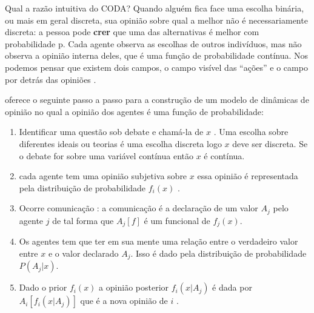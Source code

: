 Qual a razão intuitiva do CODA?  Quando alguém fica face uma escolha
binária, ou mais em geral discreta, sua opinião sobre qual a melhor
não é necessariamente discreta: a pessoa pode \textbf{crer} que uma
das alternativas é melhor com probabilidade p. Cada agente observa as
escolhas de outros indivíduos, mas não observa a opinião interna
deles, que é uma função de probabilidade contínua. Nos podemos pensar
que existem dois campos, o campo visível das ``ações'' e o campo por
detrás das opiniões \cite{martins2008continuous}.

  oferece o seguinte passo a passo
para a construção de um modelo de dinâmicas de opinião no qual a opinião dos
agentes é uma função de probabilidade:

\begin{enumerate}
\item Identificar uma questão sob debate e chamá-la de $x$ . Uma
  escolha sobre diferentes ideais ou teorias é uma escolha discreta
  logo $x$ deve ser discreta. Se o debate for sobre uma variável
  contínua então $x$ é contínua.
\item cada agente tem uma opinião subjetiva sobre $x$ essa opinião é
  representada pela distribuição de probabilidade $f_i(x)$ .
\item Ocorre comunicação : a comunicação é a declaração de um valor
  $ A_j$ pelo agente $j$ de tal forma que $A_j[f]$ é um funcional de
  $f_j(x)$.
\item Os agentes tem que ter em sua mente  uma relação entre o
  verdadeiro valor entre $x$ e o valor declarado $A_j$. Isso é dado
  pela distribuição de probabilidade $P(A_j|x)$.
\item Dado o prior $f_i(x)$ a opinião posterior $f_i(x|A_j)$ é dada
  por $A_i[f_i(x|A_j)]$ que é a nova opinião de $i$ .
\end{enumerate}
